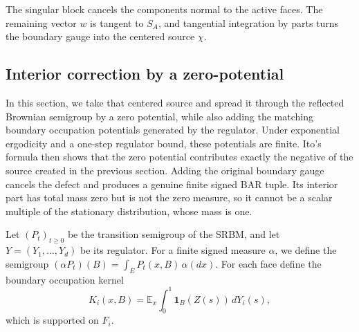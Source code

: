\documentclass[aihp]{imsart}
\numberwithin{equation}{section}
\theoremstyle{plain}
\theoremstyle{definition}
\newcommand{\1}{\mathbf 1}
\begin{document}
The singular block cancels the components normal to the active faces. The remaining vector $w$ is tangent to $S_A$, and tangential integration by parts turns the boundary gauge into the centered source $\chi$.

\subsection{Interior correction by a zero-potential}

In this section, we take that centered source and spread it through the reflected Brownian semigroup by a zero potential, while also adding the matching boundary occupation potentials generated by the regulator. Under exponential ergodicity and a one-step regulator bound, these potentials are finite. Ito’s formula then shows that the zero potential contributes exactly the negative of the source created in the previous section. Adding the original boundary gauge cancels the defect and produces a genuine finite signed BAR tuple. Its interior part has total mass zero but is not the zero measure, so it cannot be a scalar multiple of the stationary distribution, whose mass is one. 

Let $(P_t)_{t\ge0}$ be the transition semigroup of the SRBM, and let $Y=(Y_1,\ldots,Y_d)$ be its regulator. For a finite signed measure $\alpha$, we define the semigroup $(\alpha P_t)(B)=\int_E P_t(x,B)\,\alpha(dx).$ For each face define the  boundary occupation kernel
\begin{equation}\label{eq:ce-Ki}
 K_i(x,B)=\mathbb E_x\int_0^1 \1_B(Z(s))\,dY_i(s),
\end{equation}
which is supported on $F_i$.
\end{document}
